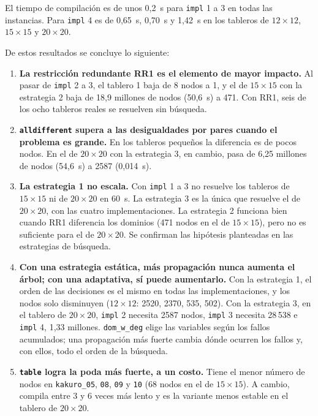 El tiempo de compilación es de unos 0,2~s para \texttt{impl} 1 a 3 en todas las instancias. Para \texttt{impl} 4 es de 0,65~s, 0,70~s y 1,42~s en los tableros de $12 \times 12$, $15 \times 15$ y $20 \times 20$.

De estos resultados se concluye lo siguiente:

\begin{enumerate}
    \item \textbf{La restricción redundante RR1 es el elemento de mayor impacto.} Al pasar de \texttt{impl} 2 a 3, el tablero 1 baja de 8 nodos a 1, y el de $15 \times 15$ con la estrategia 2 baja de 18,9 millones de nodos (50,6~s) a 471. Con RR1, seis de los ocho tableros reales se resuelven sin búsqueda.
    \item \textbf{\texttt{alldifferent} supera a las desigualdades por pares cuando el problema es grande.} En los tableros pequeños la diferencia es de pocos nodos. En el de $20 \times 20$ con la estrategia 3, en cambio, pasa de 6,25 millones de nodos (54,6~s) a 2587 (0,014~s).
    \item \textbf{La estrategia 1 no escala.} Con \texttt{impl} 1 a 3 no resuelve los tableros de $15 \times 15$ ni de $20 \times 20$ en 60~s. La estrategia 3 es la única que resuelve el de $20 \times 20$, con las cuatro implementaciones. La estrategia 2 funciona bien cuando RR1 diferencia los dominios (471 nodos en el de $15 \times 15$), pero no es suficiente para el de $20 \times 20$. Se confirman las hipótesis planteadas en las estrategias de búsqueda.
    \item \textbf{Con una estrategia estática, más propagación nunca aumenta el árbol; con una adaptativa, sí puede aumentarlo.} Con la estrategia 1, el orden de las decisiones es el mismo en todas las implementaciones, y los nodos solo disminuyen ($12 \times 12$: 2520, 2370, 535, 502). Con la estrategia 3, en el tablero de $20 \times 20$, \texttt{impl} 2 necesita 2587 nodos, \texttt{impl} 3 necesita 28\,538 e \texttt{impl} 4, 1,33 millones. \texttt{dom\_w\_deg} elige las variables según los fallos acumulados; una propagación más fuerte cambia dónde ocurren los fallos y, con ellos, todo el orden de la búsqueda.
    \item \textbf{\texttt{table} logra la poda más fuerte, a un costo.} Tiene el menor número de nodos en \texttt{kakuro\_05}, \texttt{08}, \texttt{09} y \texttt{10} (68 nodos en el de $15 \times 15$). A cambio, compila entre 3 y 6 veces más lento y es la variante menos estable en el tablero de $20 \times 20$.
\end{enumerate}

